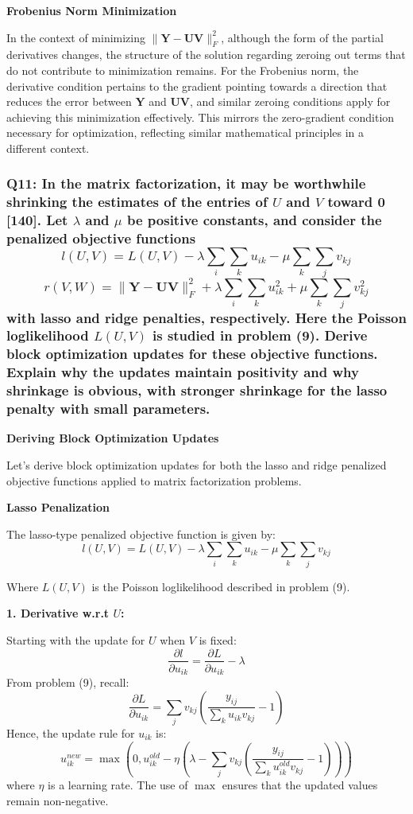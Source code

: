 \documentclass[8pt]{article}
\begin{document}
\textbf{Frobenius Norm Minimization}

In the context of minimizing \(\|\mathbf{Y} - \mathbf{U} \mathbf{V}\|_F^2\), although the form of the partial derivatives changes, the structure of the solution regarding zeroing out terms that do not contribute to minimization remains. For the Frobenius norm, the derivative condition pertains to the gradient pointing towards a direction that reduces the error between \(\mathbf{Y}\) and \(\mathbf{U} \mathbf{V}\), and similar zeroing conditions apply for achieving this minimization effectively. This mirrors the zero-gradient condition necessary for optimization, reflecting similar mathematical principles in a different context.

\subsubsection*{Q11: In the matrix factorization, it may be worthwhile shrinking the estimates of the entries of \(U\) and \(V\) toward 0 [140]. Let \(\lambda\) and \(\mu\) be positive constants, and consider the penalized objective functions
\[
l(U, V) = L(U, V) - \lambda \sum_i \sum_k u_{ik} - \mu \sum_k \sum_j v_{kj}
\]
\[
r(V, W) = \|\mathbf{Y} - \mathbf{UV}\|_F^2 + \lambda \sum_i \sum_k u_{ik}^2 + \mu \sum_k \sum_j v_{kj}^2
\]
\noindent with lasso and ridge penalties, respectively. Here the Poisson loglikelihood \(L(U, V)\) is studied in problem (9). Derive block optimization updates for these objective functions. Explain why the updates maintain positivity and why shrinkage is obvious, with stronger shrinkage for the lasso penalty with small parameters.}

\textbf{Deriving Block Optimization Updates}

Let's derive block optimization updates for both the lasso and ridge penalized objective functions applied to matrix factorization problems. 

\textbf{Lasso Penalization}

The lasso-type penalized objective function is given by:
\[
l(U, V) = L(U, V) - \lambda \sum_i \sum_k u_{ik} - \mu \sum_k \sum_j v_{kj}
\]

Where \(L(U, V)\) is the Poisson loglikelihood described in problem (9).

\textbf{1. Derivative w.r.t \(U\):}
   
   Starting with the update for \(U\) when \(V\) is fixed:
   \[
   \frac{\partial l}{\partial u_{ik}} = \frac{\partial L}{\partial u_{ik}} - \lambda
   \]
   From problem (9), recall:
   \[
   \frac{\partial L}{\partial u_{ik}} = \sum_j v_{kj} \left( \frac{y_{ij}}{\sum_k u_{ik}v_{kj}} - 1 \right)
   \]
   Hence, the update rule for \(u_{ik}\) is:
   \[
   u_{ik}^{new} = \max\left(0, u_{ik}^{old} - \eta \left(\lambda - \sum_j v_{kj} \left( \frac{y_{ij}}{\sum_k u_{ik}^{old} v_{kj}} - 1 \right)\right)\right)
   \]
   where \(\eta\) is a learning rate. The use of \(\max\) ensures that the updated values remain non-negative.
\end{document}

